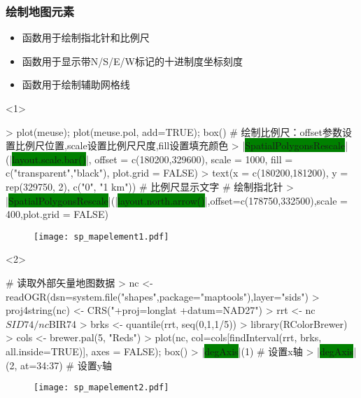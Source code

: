 \subsubsection{绘制地图元素}
\begin{frame}[t,fragile]{\subsecname}{\subsubsecname}
\begin{itemize} 
\item<1-> 函数用于绘制指北针和比例尺
\item<2-> 函数用于显示带N/S/E/W标记的十进制度坐标刻度
\item<3-> 函数用于绘制辅助网格线
\end{itemize}

\begin{overlayarea}{\textwidth}{\textheight}
\begin{onlyenv}<1>
\begin{rcode}
> plot(meuse); plot(meuse.pol, add=TRUE); box()
# 绘制比例尺：offset参数设置比例尺位置,scale设置比例尺尺度,fill设置填充颜色
> |\colorbox{green}{SpatialPolygonsRescale}|(|\colorbox{green}{layout.scale.bar()}|, offset = c(180200,329600), scale = 1000, fill = c("transparent","black"), plot.grid = FALSE)
> text(x = c(180200,181200), y = rep(329750, 2), c("0", "1 km")) # 比例尺显示文字
# 绘制指北针
> |\colorbox{green}{SpatialPolygonsRescale}|(|\colorbox{green}{layout.north.arrow()}|,offset=c(178750,332500),scale = 400,plot.grid = FALSE)
\end{rcode}
\begin{figure}[ht] \vspace{-5pt}
  \centering 
  \texttt{[image: sp\_mapelement1.pdf]}
\end{figure}
\end{onlyenv}

\begin{onlyenv}<2>
\begin{rcode}
# 读取外部矢量地图数据
> nc <- readOGR(dsn=system.file("shapes",package="maptools"),layer="sids")
> proj4string(nc) <- CRS("+proj=longlat +datum=NAD27")
> rrt <- nc$SID74/nc$BIR74
> brks <- quantile(rrt, seq(0,1,1/5))
> library(RColorBrewer)
> cols <- brewer.pal(5, "Reds")
> plot(nc, col=cols[findInterval(rrt, brks, all.inside=TRUE)], axes = FALSE); box()
> |\colorbox{green}{degAxis}|(1) # 设置x轴
> |\colorbox{green}{degAxis}|(2, at=34:37) # 设置y轴
\end{rcode}
\begin{figure}[ht] \vspace{-10pt}
  \centering 
  \texttt{[image: sp\_mapelement2.pdf]}
\end{figure}
\end{onlyenv}


\end{overlayarea}
\end{frame}
